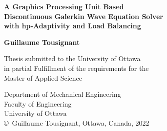 \thispagestyle{empty}

\begin{titlepage}
	\begin{center}
		\vspace*{1cm} %
		
		{ \LARGE
			\textbf{A Graphics Processing Unit Based \\ 
				Discontinuous Galerkin Wave Equation Solver \\
				with hp-Adaptivity and Load Balancing \\
			}
		}
		\vspace{1cm}

		
		{\large
			\textbf{Guillaume Tousignant}
		}
	
		\vspace{1cm}
	
		{\large
		Thesis submitted to the University of Ottawa \\
		in partial Fulfillment of the requirements for the \\
		}	
		\vspace{.3cm}
		{\Large
			Master of Applied Science \\
		}
		

		

		
		
		\vspace{3cm}
		Department of Mechanical Engineering \\
		Faculty of Engineering \\
		University of Ottawa \\
		\vfill
		\copyright\ Guillaume Tousignant, Ottawa, Canada, 2022
		
		
	\end{center}
\end{titlepage}

